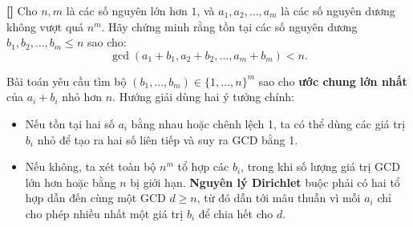 \documentclass[../01-divisibility.tex]{subfiles}
\begin{document}
\begin{example*}\label{example:EGMO-2015-P3}\textbf{[]}
	Cho \( n, m \) là các số nguyên lớn hơn \( 1 \), và \( a_1, a_2, \dots, a_m \) là các số nguyên dương không vượt quá \( n^m \).
	Hãy chứng minh rằng tồn tại các số nguyên dương \( b_1, b_2, \dots, b_m \leq n \) sao cho:
	\[
		\gcd(a_1 + b_1, a_2 + b_2, \dots, a_m + b_m) < n.
	\]
\end{example*}

\begin{story*}
	Bài toán yêu cầu tìm bộ \( (b_1, \dots, b_m) \in \{1, \dots, n\}^m \) sao cho \textbf{ước chung lớn nhất} của \( a_i + b_i \) nhỏ hơn \( n \). 
	Hướng giải dùng hai ý tưởng chính:
	\begin{itemize}[topsep=0pt, partopsep=0pt, itemsep=0pt]
		\item Nếu tồn tại hai số \( a_i \) bằng nhau hoặc chênh lệch 1, ta có thể dùng các giá trị \( b_i \) nhỏ để tạo ra hai số liên tiếp và suy ra GCD bằng 1.
		\item Nếu không, ta xét toàn bộ \( n^m \) tổ hợp các \( b_i \), trong khi số lượng giá trị GCD lớn hơn hoặc bằng \( n \) bị giới hạn. 
		      \textbf{Nguyên lý Dirichlet} buộc phải có hai tổ hợp dẫn đến cùng một GCD \( d \geq n \), từ đó dẫn tới mâu thuẫn vì mỗi \( a_i \) chỉ cho phép nhiều nhất một giá trị \( b_i \) để chia hết cho \( d \).
	\end{itemize}
\end{story*}

\bigbreak
\end{document}
